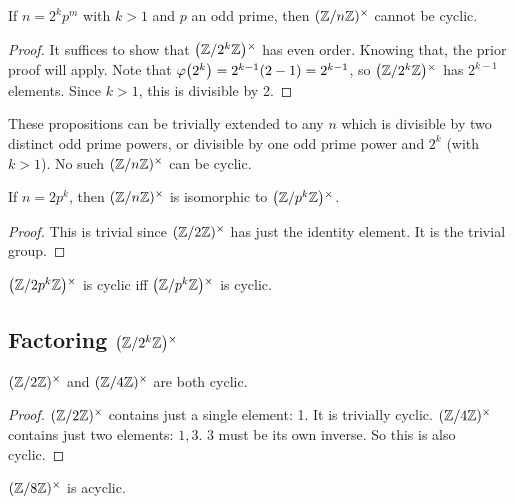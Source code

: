 \begin{proposition}
  If $n = 2^k p^m$ with $k > 1$ and $p$ an odd prime, then $\Zmodnx$
  cannot be cyclic.
\end{proposition}

\begin{proof}
  It suffices to show that $\Zmodx{2^k}$ has even order. Knowing that,
  the prior proof will apply. Note that $\vphif{2^k} = 2^{k-1}(2 - 1) =
  2^{k-1}$, so $\Zmodx{2^k}$ has $2^{k-1}$ elements. Since $k>1$, this
  is divisible by 2.
\end{proof}

\begin{remark}
  These propositions can be trivially extended to any $n$ which is
  divisible by two distinct odd prime powers, or divisible by one odd
  prime power and $2^k$ (with $k > 1$). No such $\Zmodnx$ can be cyclic.
\end{remark}

\begin{proposition}
  If $n = 2 p^k$, then $\Zmodnx$ is isomorphic to $\Zmodx{p^k}$.
\end{proposition}

\begin{proof}
  This is trivial since $\Zmodx{2}$ has just the identity element. It is
  the trivial group.
\end{proof}

\begin{corollary}
  $\Zmodx{2 p^k}$ is cyclic iff $\Zmodx{p^k}$ is cyclic.
\end{corollary}

\subsection{Factoring $\Zmodx{2^k}$}

\begin{proposition}
  $\Zmodx{2}$ and $\Zmodx{4}$ are both cyclic.
\end{proposition}

\begin{proof}
  $\Zmodx{2}$ contains just a single element: 1. It is trivially cyclic.
  $\Zmodx{4}$ contains just two elements: $1, 3$. $3$ must be its own
  inverse. So this is also cyclic.
\end{proof}

\begin{proposition}
  $\Zmodx{8}$ is acyclic.
\end{proposition}

